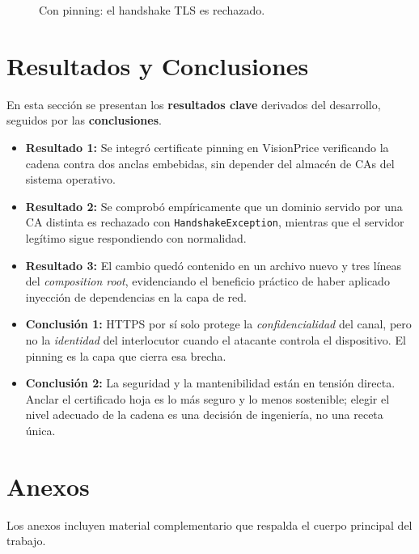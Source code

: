 \documentclass[12pt, a4paper]{article} %
\begin{document}
\begin{figure}[h]
    \centering
    \caption{Con pinning: el handshake TLS es rechazado.}
    \label{fig:conpinning}
\end{figure}

\section{Resultados y Conclusiones}
\label{sec:resultados}
En esta sección se presentan los \textbf{resultados clave} derivados del
desarrollo, seguidos por las \textbf{conclusiones}.

\begin{itemize}
    \item \textbf{Resultado 1:} Se integró certificate pinning en VisionPrice
    verificando la cadena contra dos anclas embebidas, sin depender del
    almacén de CAs del sistema operativo.
    \item \textbf{Resultado 2:} Se comprobó empíricamente que un dominio
    servido por una CA distinta es rechazado con \texttt{HandshakeException},
    mientras que el servidor legítimo sigue respondiendo con normalidad.
    \item \textbf{Resultado 3:} El cambio quedó contenido en un archivo nuevo
    y tres líneas del \textit{composition root}, evidenciando el beneficio
    práctico de haber aplicado inyección de dependencias en la capa de red.
    \item \textbf{Conclusión 1:} HTTPS por sí solo protege la
    \textit{confidencialidad} del canal, pero no la \textit{identidad} del
    interlocutor cuando el atacante controla el dispositivo. El pinning es la
    capa que cierra esa brecha.
    \item \textbf{Conclusión 2:} La seguridad y la mantenibilidad están en
    tensión directa. Anclar el certificado hoja es lo más seguro y lo menos
    sostenible; elegir el nivel adecuado de la cadena es una decisión de
    ingeniería, no una receta única.
\end{itemize}

\clearpage %

\section{Anexos}
\label{sec:anexos}
Los anexos incluyen material complementario que respalda el cuerpo principal
del trabajo.
\end{document}
